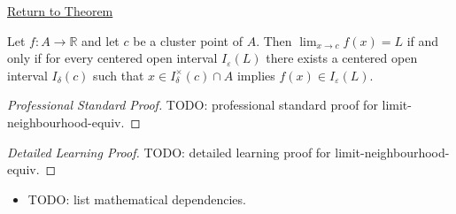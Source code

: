 \newpage
{}
\label{prf:limit-neighbourhood-equiv}

\begin{remark*}[Return]
\hyperref[prop:limit-neighbourhood-equiv]{Return to Theorem}
\end{remark*}

\begin{proposition*}
Let $f : A \to \mathbb{R}$ and let $c$ be a cluster point of $A$.
Then $\lim_{x\to c}f(x)=L$ if and only if for every
centered open interval $I_\varepsilon(L)$ there exists a centered
open interval $I_\delta(c)$ such that
$x\in I_\delta^\times(c)\cap A$ implies $f(x)\in I_\varepsilon(L)$.

\smallskip\noindent
\end{proposition*}

\begin{proof}[Professional Standard Proof]
\LRAProofBodyStart
TODO: professional standard proof for limit-neighbourhood-equiv.
\end{proof}

\begin{proof}[Detailed Learning Proof]
\LRAProofBodyStart
TODO: detailed learning proof for limit-neighbourhood-equiv.
\end{proof}

\begin{remark*}
\end{remark*}

\begin{dependencies}
\begin{itemize}
  \item TODO: list mathematical dependencies.
\end{itemize}
\end{dependencies}

\clearpage
